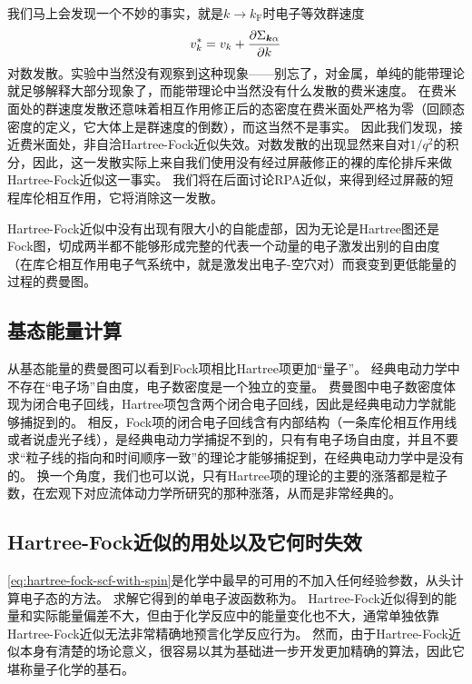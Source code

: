 我们马上会发现一个不妙的事实，就是$k \to k_\text{F}$时电子等效群速度
\begin{equation}
    v^*_k = v_k + \pdv{\Sigma_{\vb*{k} \alpha}}{k}
    \label{eq:group-velocity-fermi-surface-hf}
\end{equation}
对数发散。实验中当然没有观察到这种现象——别忘了，对金属，单纯的能带理论就足够解释大部分现象了，而能带理论中当然没有什么发散的费米速度。
在费米面处的群速度发散还意味着相互作用修正后的态密度在费米面处严格为零（回顾态密度的定义，它大体上是群速度的倒数），而这当然不是事实。
因此我们发现，接近费米面处，非自洽Hartree-Fock近似失效。对数发散的出现显然来自对$1 / q^2$的积分，因此，这一发散实际上来自我们使用没有经过屏蔽修正的裸的库伦排斥来做Hartree-Fock近似这一事实。
我们将在后面讨论RPA近似，来得到经过屏蔽的短程库伦相互作用，它将消除这一发散。

Hartree-Fock近似中没有出现有限大小的自能虚部，因为无论是Hartree图还是Fock图，切成两半都不能够形成完整的代表一个动量的电子激发出别的自由度（在库仑相互作用电子气系统中，就是激发出电子-空穴对）而衰变到更低能量的过程的费曼图。

\subsection{基态能量计算}

从基态能量的费曼图可以看到Fock项相比Hartree项更加“量子”。
经典电动力学中不存在“电子场”自由度，电子数密度是一个独立的变量。
费曼图中电子数密度体现为闭合电子回线，Hartree项包含两个闭合电子回线，因此是经典电动力学就能够捕捉到的。
相反，Fock项的闭合电子回线含有内部结构（一条库伦相互作用线或者说虚光子线），是经典电动力学捕捉不到的，只有有电子场自由度，并且不要求“粒子线的指向和时间顺序一致”的理论才能够捕捉到，在经典电动力学中是没有的。
换一个角度，我们也可以说，只有Hartree项的理论的主要的涨落都是粒子数，在宏观下对应流体动力学所研究的那种涨落，从而是非常经典的。

\subsection{Hartree-Fock近似的用处以及它何时失效}\label{sec:hf-success-failure}

\eqref{eq:hartree-fock-scf-with-spin}是化学中最早的可用的不加入任何经验参数，从头计算电子态的方法。
求解它得到的单电子波函数称为。
Hartree-Fock近似得到的能量和实际能量偏差不大，但由于化学反应中的能量变化也不大，通常单独依靠Hartree-Fock近似无法非常精确地预言化学反应行为。
然而，由于Hartree-Fock近似本身有清楚的场论意义，很容易以其为基础进一步开发更加精确的算法，因此它堪称量子化学的基石。

